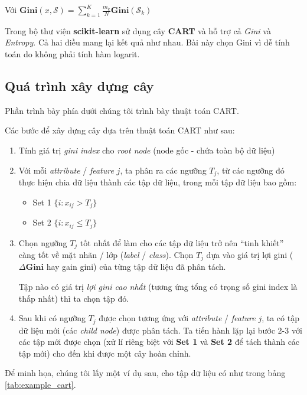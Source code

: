\documentclass[../main-report.tex]{subfiles}
\begin{document}
Với $\mathbf{Gini}(x, \mathcal{S}) = \sum_{k=1}^K \frac{m_k}{N} \mathbf{Gini}(\mathcal{S}_k)$

Trong bộ thư viện \textbf{scikit-learn} sử dụng cây \textbf{CART} và hỗ trợ cả \emph{Gini} và \emph{Entropy}. Cả hai điều mang lại kết quả như nhau. Bài này chọn Gini vì dễ tính toán do không phải tính hàm logarit.

\subsection{Quá trình xây dựng cây}
Phần trình bày phía dưới chúng tôi trình bày thuật toán CART.

Các bước để xây dựng cây dựa trên thuật toán CART như sau:

\begin{enumerate}
\item Tính giá trị \emph{gini index} cho \emph{root node} (node gốc - chứa toàn bộ dữ liệu)

\item Với mỗi \emph{attribute} / \emph{feature} $j$, ta phân ra các ngưỡng $T_j$, từ các ngưỡng đó thực hiện chia dữ liệu thành các tập dữ liệu, trong mỗi tập dữ liệu bao gồm:

\begin{itemize}
\item Set 1 $\{ i: x_{ij} > T_j \}$
\item Set 2 $\{ i: x_{ij} \le T_j \}$
\end{itemize}

\item Chọn ngưỡng $T_j$ tốt nhất để làm cho các tập dữ liệu trở nên ``tinh khiết'' càng tốt về mặt nhãn / lớp (\emph{label} / \emph{class}). Chọn $T_j$ dựa vào giá trị lợi gini ($\Delta\mathbf{Gini}$ hay gain gini) của từng tập dữ liệu đã phân tách.

Tập nào có giá trị \emph{lợi gini cao nhất} (tương ứng tổng có trọng số gini index là thấp nhất) thì ta chọn tập đó.

\item Sau khi có ngưỡng $T_j$ được chọn tương ứng với \emph{attribute} / \emph{feature} $j$, ta có tập dữ liệu mới (các \emph{child node}) được phân tách. Ta tiến hành lặp lại bước 2-3 với các tập mới được chọn (xử lí riêng biệt với \textbf{Set 1} và \textbf{Set 2} để tách thành các tập mới) cho đến khi được một cây hoàn chỉnh.
\end{enumerate}

Để minh họa, chúng tôi lấy một ví dụ sau, cho tập dữ liệu có như trong bảng \ref{tab:example_cart}.
\end{document}
